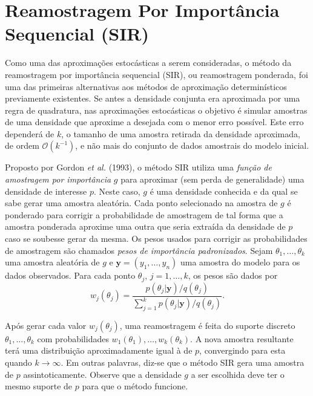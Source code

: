 \section{Reamostragem Por Importância Sequencial (SIR)}\label{sir}

Como uma das aproximações estocásticas a serem consideradas, o método da reamostragem por importância sequencial (SIR), ou reamostragem ponderada, foi uma das primeiras alternativas aos métodos de aproximação determinísticos previamente existentes. Se antes a densidade conjunta era aproximada por uma regra de quadratura, nas aproximações estocásticas o objetivo é simular amostras de uma densidade que aproxime a desejada com o menor erro possível. Este erro dependerá de $k$, o tamanho de uma amostra retirada da densidade aproximada, de ordem $\mathcal{O}(k^{-1})$, e não mais do conjunto de dados amostrais do modelo inicial.

Proposto por Gordon \textit{et al.} (1993)\cite{Gordon1993}, o método SIR utiliza uma \textit{função de amostragem por importância} $g$ para aproximar (sem perda de generalidade) uma densidade de interesse $p$. Neste caso, $g$ é uma densidade conhecida e da qual se sabe gerar uma amostra aleatória. Cada ponto selecionado na amostra de $g$ é ponderado para corrigir a probabilidade de amostragem de tal forma que a amostra ponderada aproxime uma outra que seria extraída da densidade de $p$ caso se soubesse gerar da mesma. Os pesos usados para corrigir as probabilidades de amostragem são chamados \textit{pesos de importância padronizados}. Sejam $\theta_1, \ldots, \theta_k$ uma amostra aleatória de $g$ e $\bm{y} = (y_1, \ldots, y_n)$ uma amostra do modelo para os dados observados. Para cada ponto $\theta_j$, $j = 1, \ldots, k$, os pesos são dados por
\begin{equation}\label{eq:sir_wei}
w_j(\theta_j) = \dfrac{p(\theta_j | \bm{y}) / q(\theta_j)}{\sum_{j=1}^{k} p(\theta_j | \bm{y}) / q(\theta_j)}.
\end{equation}

Após gerar cada valor $w_j(\theta_j)$, uma reamostragem é feita do suporte discreto $\theta_1, \ldots, \theta_k$ com probabilidades $w_1(\theta_1), \ldots, w_k(\theta_k)$. A nova amostra resultante terá uma distribuição aproximadamente igual à de $p$, convergindo para esta quando $k \rightarrow \infty$. Em outras palavras, diz-se que o método SIR gera uma amostra de $p$ assintoticamente. Observe que a densidade $g$ a ser escolhida deve ter o mesmo suporte de $p$ para que o método funcione.

